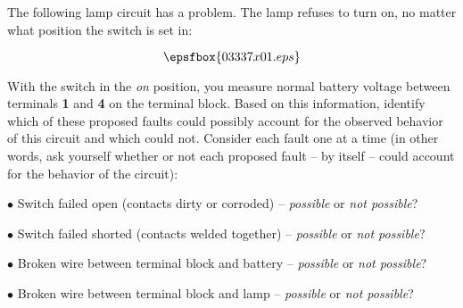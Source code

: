 

The following lamp circuit has a problem.  The lamp refuses to turn on, no matter what position the switch is set in:

$$\epsfbox{03337x01.eps}$$

With the switch in the {\it on} position, you measure normal battery voltage between terminals {\bf 1} and {\bf 4} on the terminal block.  Based on this information, identify which of these proposed faults could possibly account for the observed behavior of this circuit and which could not.  Consider each fault one at a time (in other words, ask yourself whether or not each proposed fault -- by itself -- could account for the behavior of the circuit):

\medskip
\item{$\bullet$} Switch failed open (contacts dirty or corroded) -- {\it possible} or {\it not possible}? 
\item{$\bullet$} Switch failed shorted (contacts welded together) -- {\it possible} or {\it not possible}? 
\item{$\bullet$} Broken wire between terminal block and battery -- {\it possible} or {\it not possible}?
\item{$\bullet$} Broken wire between terminal block and lamp -- {\it possible} or {\it not possible}?
\medskip







